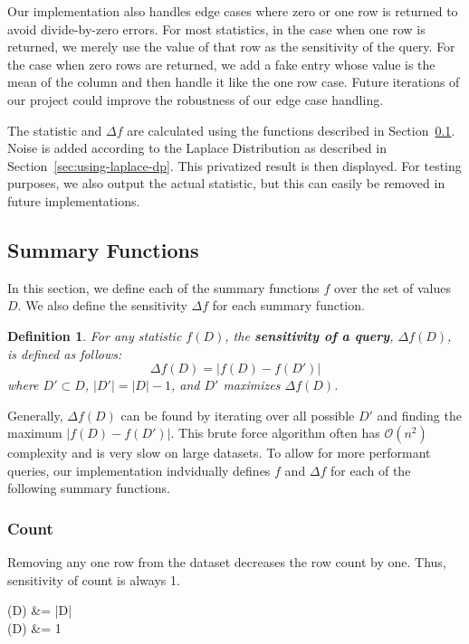\documentclass[conference,11pt]{IEEEtran}
\newtheorem{definition}{Definition}
\begin{document}
Our implementation also handles edge cases where zero or one row is returned to
avoid divide-by-zero errors.  For most statistics, in the case when one row is
returned, we merely use the value of that row as the sensitivity of the query.
For the case when zero rows are returned, we add a fake entry whose value is the
mean of the column and then handle it like the one row case. Future iterations
of our project could improve the robustness of our edge case handling.

The statistic and $\Delta f$ are calculated using the functions described in
Section~\ref{sec:summary-functions}. Noise is added according to the Laplace
Distribution as described in Section~\ref{sec:using-laplace-dp}. This privatized
result is then displayed. For testing purposes, we also output the actual
statistic, but this can easily be removed in future implementations.

\subsection{Summary Functions}\label{sec:summary-functions}
In this section, we define each of the summary functions $f$ over the set of
values $D$. We also define the sensitivity $\Delta f$ for each summary function.
\begin{mdframed}
    \begin{definition}
        For any statistic $f(D)$, the \textbf{sensitivity of a query}, $\Delta
        f(D)$, is defined as follows:
        \begin{equation}
            \Delta f(D) = \left|f(D) - f(D')\right|
        \end{equation}
        where $D' \subset D$, $|D'| = |D| - 1$, and $D'$ maximizes $\Delta
        f(D)$.
    \end{definition}
\end{mdframed}

Generally, $\Delta f(D)$ can be found by iterating over all possible $D'$ and
finding the maximum $|f(D) - f(D')|$. This brute force algorithm often has $\mathcal{O}(n^2)$
complexity and is very slow on large datasets. To allow for more performant
queries, our implementation indvidually defines $f$ and $\Delta f$ for each of
the following summary functions.

\subsubsection{Count}
Removing any one row from the dataset decreases the row count by one. Thus,
sensitivity of count is always 1.
\begin{equations}
    (D) &= |D| \\
    \Delta{}(D) &= 1
\end{equations}
\end{document}
